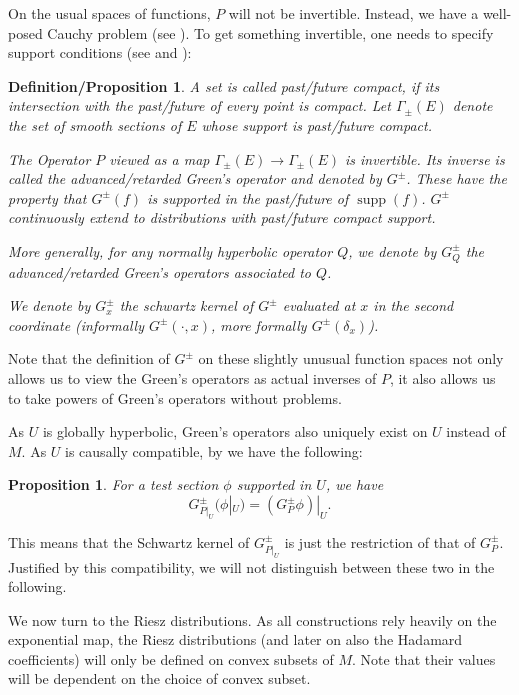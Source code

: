 \documentclass[11pt]{article}
\newtheorem{prop}[df]{Proposition}
\newtheorem{defprop}[df]{Definition/Proposition}
\DeclareMathOperator{\supp}{supp}
\begin{document}
On the usual spaces of functions, $P$ will not be invertible. Instead, we have a well-posed Cauchy problem (see \cite[Theorem 3.2.11]{BGP}). To get something invertible, one needs to specify support conditions (see \cite[Definition 3.4.1 and Corollary 3.4.3]{BGP} and \cite[Theorem 3.8 and Lemma 4.1]{GH}):
\begin{defprop}
	\label{dfG}
	A set is called past/future compact, if its intersection with the past/future of every point is compact. Let $\Gamma_\pm(E)$ denote the set of smooth sections of $E$ whose support is past/future compact.
	
	The Operator $P$ viewed as a map $\Gamma_\pm(E)\rightarrow \Gamma_\pm(E)$ is invertible. Its inverse is called the advanced/retarded Green's operator and denoted by $G^\pm$. These have the property that $G^\pm(f)$ is supported in the past/future of $\supp(f)$. $G^\pm$ continuously extend to distributions with past/future compact support.
	
	More generally, for any normally hyperbolic operator $Q$, we denote by $G^\pm_Q$ the advanced/retarded Green's operators associated to $Q$.
	
	We denote by $G^\pm_x$ the schwartz kernel of $G^\pm$ evaluated at $x$ in the second coordinate (informally $G^\pm(\cdot,x)$, more formally $G^\pm(\delta_x)$).
\end{defprop}
Note that the definition of $G^\pm$ on these slightly unusual function spaces not only allows us to view the Green's operators as actual inverses of $P$, it also allows us to take powers of Green's operators without problems.

As $U$ is globally hyperbolic, Green's operators also uniquely exist on $U$ instead of $M$. As $U$ is causally compatible, by \cite[Proposition 3.5.1.]{BGP} we have the following:
\begin{prop}
	For a test section $\phi$ supported in $U$, we have
	\[G^\pm_{P|_U}(\phi|_U)=(G^\pm_{P}\phi)|_U.\]
\end{prop}
This means that the Schwartz kernel of $G^\pm_{P|_U}$ is just the restriction of that of $G^\pm_{P}$. Justified by this compatibility, we will not distinguish between these two in the following.

We now turn to the Riesz distributions. As all constructions rely heavily on the exponential map, the Riesz distributions (and later on also the Hadamard coefficients) will only be defined on convex subsets of $M$. Note that their values will be dependent on the choice of convex subset.
\end{document}
